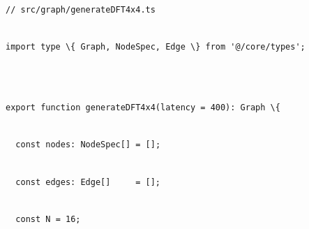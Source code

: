 \documentclass[
]{article}
\newcommand{\passthrough}[1]{#1}
\begin{document}
\passthrough{\lstinline!//!}\passthrough{\lstinline! !}\passthrough{\lstinline!src!}\passthrough{\lstinline!/!}\passthrough{\lstinline!graph!}\passthrough{\lstinline!/!}\passthrough{\lstinline!generateDFT!}\passthrough{\lstinline!4!}\passthrough{\lstinline!x!}\passthrough{\lstinline!4.!}\passthrough{\lstinline!ts!}\strut \\
\passthrough{\lstinline!import!}\passthrough{\lstinline! !}\passthrough{\lstinline!type!}\passthrough{\lstinline! !}\passthrough{\lstinline!\{!}\passthrough{\lstinline! !}\passthrough{\lstinline!Graph!}\passthrough{\lstinline!,!}\passthrough{\lstinline! !}\passthrough{\lstinline!NodeSpec!}\passthrough{\lstinline!,!}\passthrough{\lstinline! !}\passthrough{\lstinline!Edge!}\passthrough{\lstinline! !}\passthrough{\lstinline!\}!}\passthrough{\lstinline! !}\passthrough{\lstinline!from!}\passthrough{\lstinline! !}\passthrough{\lstinline!'@/!}\passthrough{\lstinline!core!}\passthrough{\lstinline!/!}\passthrough{\lstinline!types!}\passthrough{\lstinline!';!}\strut \\
\strut \\
\passthrough{\lstinline!export!}\passthrough{\lstinline! !}\passthrough{\lstinline!function!}\passthrough{\lstinline! !}\passthrough{\lstinline!generateDFT!}\passthrough{\lstinline!4!}\passthrough{\lstinline!x!}\passthrough{\lstinline!4(!}\passthrough{\lstinline!latency!}\passthrough{\lstinline! !}\passthrough{\lstinline!=!}\passthrough{\lstinline! !}\passthrough{\lstinline!400):!}\passthrough{\lstinline! !}\passthrough{\lstinline!Graph!}\passthrough{\lstinline! !}\passthrough{\lstinline!\{!}\strut \\
\passthrough{\lstinline!  !}\passthrough{\lstinline!const!}\passthrough{\lstinline! !}\passthrough{\lstinline!nodes!}\passthrough{\lstinline!:!}\passthrough{\lstinline! !}\passthrough{\lstinline!NodeSpec!}\passthrough{\lstinline![]!}\passthrough{\lstinline! !}\passthrough{\lstinline!=!}\passthrough{\lstinline! !}\passthrough{\lstinline![];!}\strut \\
\passthrough{\lstinline!  !}\passthrough{\lstinline!const!}\passthrough{\lstinline! !}\passthrough{\lstinline!edges!}\passthrough{\lstinline!:!}\passthrough{\lstinline! !}\passthrough{\lstinline!Edge!}\passthrough{\lstinline![]!}\passthrough{\lstinline!     !}\passthrough{\lstinline!=!}\passthrough{\lstinline! !}\passthrough{\lstinline![];!}\strut \\
\passthrough{\lstinline!  !}\passthrough{\lstinline!const!}\passthrough{\lstinline! !}\passthrough{\lstinline!N!}\passthrough{\lstinline! !}\passthrough{\lstinline!=!}\passthrough{\lstinline! !}\passthrough{\lstinline!16;!}\strut \\
\end{document}

